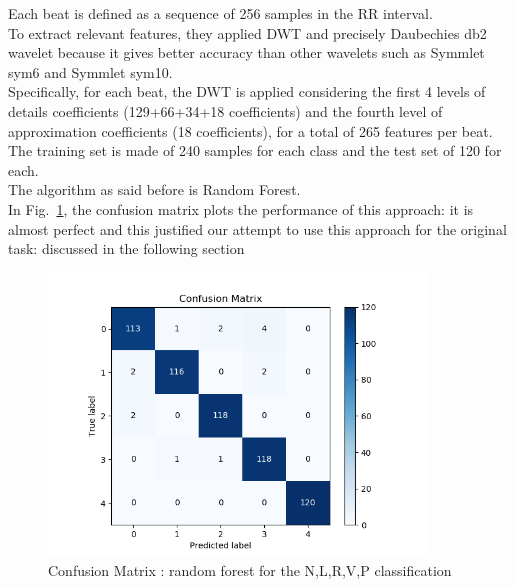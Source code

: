 \documentclass[LaM,binding=0.6cm]{sapthesis}
\begin{document}
Each beat is defined as a sequence of 256 samples in the RR interval.\\To extract relevant features, they applied DWT and precisely Daubechies db2 wavelet because it gives better accuracy than other wavelets such as Symmlet sym6 and Symmlet sym10.\\Specifically, for each beat, the DWT is applied considering the first 4 levels of details coefficients (129+66+34+18 coefficients) and the fourth level of approximation coefficients (18 coefficients), for a total of 265 features per beat.\\The training set is made of 240 samples for each class and the test set of 120 for each.\\The algorithm as said before is Random Forest.\\In Fig.~\ref{fig:rf2}, the confusion matrix plots the performance of this approach: it is almost perfect and this justified our attempt to use this approach for the original task: discussed in the following section
\begin{figure}[H]  \centering
    \includegraphics[width=100mm,scale=0.7]{confusion-matrix-dwt-random-forest-paper.png}
    \caption{Confusion Matrix : random forest for the N,L,R,V,P classification}
    \label{fig:rf2}
\end{figure}
\end{document}
